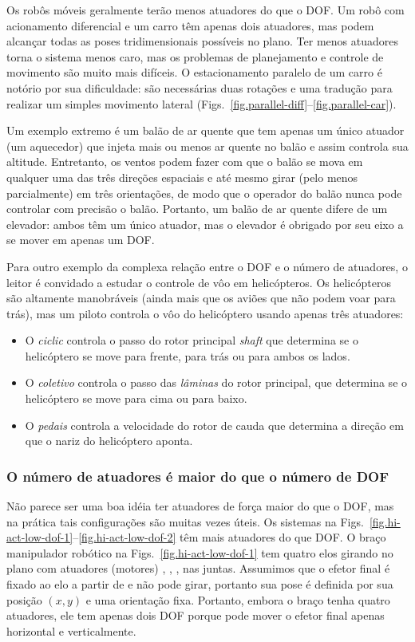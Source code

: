 Os robôs móveis geralmente terão menos atuadores do que o DOF. Um robô com acionamento diferencial e um carro têm apenas dois atuadores, mas podem alcançar todas as poses tridimensionais possíveis no plano. Ter menos atuadores torna o sistema menos caro, mas os problemas de planejamento e controle de movimento são muito mais difíceis. O estacionamento paralelo de um carro é notório por sua dificuldade: são necessárias duas rotações e uma tradução para realizar um simples movimento lateral (Figs.~\ref{fig.parallel-diff}--\ref{fig.parallel-car}).

Um exemplo extremo é um balão de ar quente que tem apenas um único atuador (um aquecedor) que injeta mais ou menos ar quente no balão e assim controla sua altitude. Entretanto, os ventos podem fazer com que o balão se mova em qualquer uma das três direções espaciais e até mesmo girar (pelo menos parcialmente) em três orientações, de modo que o operador do balão nunca pode controlar com precisão o balão. Portanto, um balão de ar quente difere de um elevador: ambos têm um único atuador, mas o elevador é obrigado por seu eixo a se mover em apenas um DOF.

Para outro exemplo da complexa relação entre o DOF e o número de atuadores, o leitor é convidado a estudar o controle de vôo em helicópteros. Os helicópteros são altamente manobráveis (ainda mais que os aviões que não podem voar para trás), mas um piloto controla o vôo do helicóptero usando apenas três atuadores:
\begin{itemize}
\item O \emph{ciclic} controla o passo do rotor principal \emph{shaft} que determina se o helicóptero se move para frente, para trás ou para ambos os lados.
\item O \emph{coletivo} controla o passo das \emph{lâminas} do rotor principal, que determina se o helicóptero se move para cima ou para baixo.
\item O \emph{pedais} controla a velocidade do rotor de cauda que determina a direção em que o nariz do helicóptero aponta.
\end{itemize}

\subsubsection*{O número de atuadores é maior do que o número de DOF}

Não parece ser uma boa idéia ter atuadores de força maior do que o DOF, mas na prática tais configurações são muitas vezes úteis. Os sistemas na Figs.~\ref{fig.hi-act-low-dof-1}--\ref{fig.hi-act-low-dof-2} têm mais atuadores do que DOF. O braço manipulador robótico na Figs.~\ref{fig.hi-act-low-dof-1} tem quatro elos girando no plano com atuadores (motores) , , ,  nas juntas. Assumimos que o efetor final é fixado ao elo a partir de  e não pode girar, portanto sua pose é definida por sua posição $(x,y)$ e uma orientação fixa. Portanto, embora o braço tenha quatro atuadores, ele tem apenas dois DOF porque pode mover o efetor final apenas horizontal e verticalmente.

